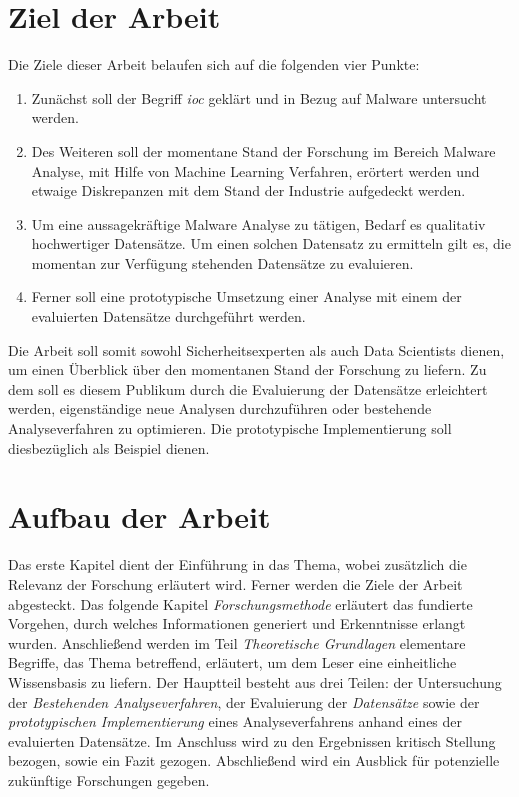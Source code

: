 \documentclass[
    12pt, %
    DIV10,
    ngerman, %
    a4paper, %
    oneside, %
    titlepage, %
    parskip=half, %
    headings=normal, %
    listof=totoc, %
    bibliography=totoc, %
    index=totoc, %
    captions=tableheading, %
    final %
]{scrreprt}
\begin{document}
\section{Ziel der Arbeit}
Die Ziele dieser Arbeit belaufen sich auf die folgenden vier Punkte:
\begin{enumerate}
\item Zunächst soll der Begriff \emph{\acl{ioc}} geklärt und in Bezug auf Malware untersucht werden. 
\item Des Weiteren soll der momentane Stand der Forschung im Bereich Malware Analyse, mit Hilfe von Machine Learning Verfahren, erörtert werden und etwaige Diskrepanzen mit dem Stand der Industrie aufgedeckt werden.
\item Um eine aussagekräftige Malware Analyse zu tätigen, Bedarf es qualitativ hochwertiger Datensätze. Um einen solchen Datensatz zu ermitteln gilt es, die momentan zur Verfügung stehenden Datensätze zu evaluieren.
\item Ferner soll eine prototypische Umsetzung einer Analyse mit einem der evaluierten Datensätze durchgeführt werden.
\end{enumerate}
Die Arbeit soll somit sowohl Sicherheitsexperten als auch Data Scientists dienen, um einen Überblick über den momentanen Stand der Forschung zu liefern. Zu dem soll es diesem Publikum durch die Evaluierung der Datensätze erleichtert werden, eigenständige neue Analysen durchzuführen oder bestehende Analyseverfahren zu optimieren. Die prototypische Implementierung soll diesbezüglich als Beispiel dienen.
\section{Aufbau der Arbeit}
Das erste Kapitel dient der Einführung in das Thema, wobei zusätzlich die Relevanz der Forschung erläutert wird. Ferner werden die Ziele der Arbeit abgesteckt. Das folgende Kapitel \emph{Forschungsmethode} erläutert das fundierte Vorgehen, durch welches Informationen generiert und Erkenntnisse erlangt wurden. Anschließend werden im Teil \emph{Theoretische Grundlagen} elementare Begriffe, das Thema betreffend, erläutert, um dem Leser eine einheitliche Wissensbasis zu liefern. Der Hauptteil besteht aus drei Teilen: der Untersuchung der \emph{Bestehenden Analyseverfahren}, der Evaluierung der \emph{Datensätze} sowie der \emph{prototypischen Implementierung} eines Analyseverfahrens anhand eines der evaluierten Datensätze. Im Anschluss wird zu den  Ergebnissen kritisch Stellung bezogen, sowie ein Fazit gezogen. Abschließend wird ein Ausblick für potenzielle zukünftige Forschungen gegeben.
\end{document}
